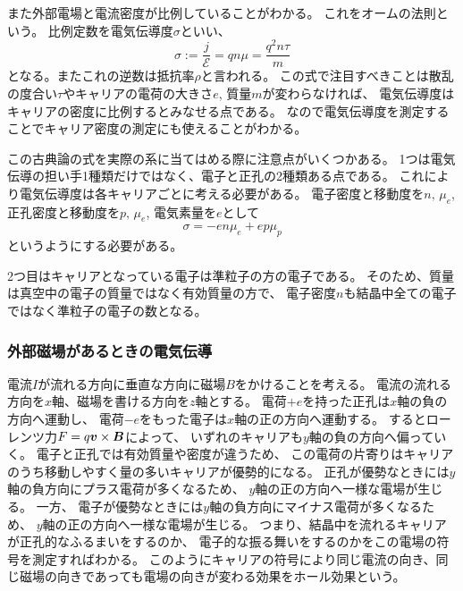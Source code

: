 \documentclass[11pt,dvipdfmx,a4paper]{jsarticle}
\numberwithin{equation}{section}
\begin{document}
また外部電場と電流密度が比例していることがわかる。
これをオームの法則という。
比例定数を電気伝導度\(\sigma\)といい、
\begin{equation}
	\sigma := \frac{j}{\mathscr{E}} = qn\mu = \frac{q^2n\tau}{m}
\end{equation}
となる。またこれの逆数は抵抗率\(\rho\)と言われる。
この式で注目すべきことは散乱の度合い\(\tau\)やキャリアの電荷の大きさ\(e\), 質量\(m\)が変わらなければ、
電気伝導度はキャリアの密度に比例するとみなせる点である。
なので電気伝導度を測定することでキャリア密度の測定にも使えることがわかる。

この古典論の式を実際の系に当てはめる際に注意点がいくつかある。
1つは電気伝導の担い手1種類だけではなく、電子と正孔の2種類ある点である。
これにより電気伝導度は各キャリアごとに考える必要がある。
電子密度と移動度を\(n,\,\mu_e\), 正孔密度と移動度を\(p,\,\mu_e\), 電気素量を\(e\)として
\begin{equation}
	\sigma = -en\mu_e +e p\mu_p
\end{equation}
というようにする必要がある。

2つ目はキャリアとなっている電子は準粒子の方の電子である。
そのため、質量は真空中の電子の質量ではなく有効質量の方で、
電子密度\(n\)も結晶中全ての電子ではなく準粒子の電子の数となる。

\subsubsection*{外部磁場があるときの電気伝導}
電流\(I\)が流れる方向に垂直な方向に磁場\(B\)をかけることを考える。
電流の流れる方向を\(x\)軸、磁場を書ける方向を\(z\)軸とする。
電荷\(+e\)を持った正孔は\(x\)軸の負の方向へ運動し、
電荷\(-e\)をもった電子は\(x\)軸の正の方向へ運動する。
するとローレンツ力\(F = q\vb*{v}\times\vb*{B}\)によって、
いずれのキャリアも\(y\)軸の負の方向へ偏っていく。
電子と正孔では有効質量や密度が違うため、
この電荷の片寄りはキャリアのうち移動しやすく量の多いキャリアが優勢的になる。
正孔が優勢なときには\(y\)軸の負方向にプラス電荷が多くなるため、
\(y\)軸の正の方向へ一様な電場が生じる。
一方、
電子が優勢なときには\(y\)軸の負方向にマイナス電荷が多くなるため、
\(y\)軸の正の方向へ一様な電場が生じる。
つまり、結晶中を流れるキャリアが正孔的なふるまいをするのか、
電子的な振る舞いをするのかをこの電場の符号を測定すればわかる。
このようにキャリアの符号により同じ電流の向き、同じ磁場の向きであっても電場の向きが変わる効果をホール効果という。
\end{document}
